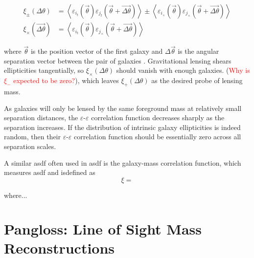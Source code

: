 \documentclass[%
 reprint,
 amsmath,amssymb,
 aps,nofootinbib
]{revtex4-1}
\begin{document}
\begin{align}\label{gg_corr_def}
\xi_\pm(\Delta\theta)&=\left<\varepsilon_{i_t}(\vec{\theta})\varepsilon_{j_t}(\vec{\theta}+\vec{\Delta\theta})\right>\pm\left<\varepsilon_{i_\times}(\vec{\theta})\varepsilon_{j_\times}(\vec{\theta}+\vec{\Delta\theta})\right>\\
\xi_\times(\vec{\Delta\theta})&=\left<\varepsilon_{i_t}(\vec{\theta})\varepsilon_{j_\times}(\vec{\theta}+\vec{\Delta\theta})\right>
\end{align}

\noindent where $\vec{\theta}$ is the position vector of the first galaxy and $\Delta\vec{\theta}$ is the angular separation vector between the pair of galaxies \cite{schneider}. Gravitational lensing shears ellipticities tangentially, so $\xi_\times(\Delta\theta)$ should vanish with enough galaxies. (\textcolor{red}{Why is $\xi_-$ expected to be zero?}), which leaves $\xi_+(\Delta\theta)$ as the desired probe of lensing mass.

As galaxies will only be lensed by the same foreground mass at relatively small separation distances, the $\varepsilon$-$\varepsilon$ correlation function decreases sharply as the separation increases. If the distribution of intrinsic galaxy ellipticities is indeed random, then their $\varepsilon$-$\varepsilon$ correlation function should be essentially zero across all separation scales. 

A similar asdf often used in asdf is the galaxy-mass correlation function, which measures asdf and isdefined as
\begin{equation}\label{ng_corr_def}
\xi=
\end{equation}

\noindent where...


\section{Pangloss: Line of Sight Mass Reconstructions} \label{pangloss}
\end{document}
